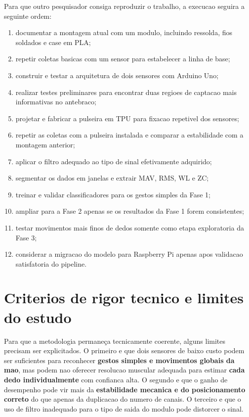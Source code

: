 \documentclass[12pt,oneside,a4paper,brazilian]{abntex2}
\begin{document}
Para que outro pesquisador consiga reproduzir o trabalho, a execucao seguira a seguinte ordem:

\begin{enumerate}
  \item documentar a montagem atual com um modulo, incluindo ressolda, fios soldados e case em PLA;
  \item repetir coletas basicas com um sensor para estabelecer a linha de base;
  \item construir e testar a arquitetura de dois sensores com Arduino Uno;
  \item realizar testes preliminares para encontrar duas regioes de captacao mais informativas no antebraco;
  \item projetar e fabricar a pulseira em TPU para fixacao repetivel dos sensores;
  \item repetir as coletas com a pulseira instalada e comparar a estabilidade com a montagem anterior;
  \item aplicar o filtro adequado ao tipo de sinal efetivamente adquirido;
  \item segmentar os dados em janelas e extrair MAV, RMS, WL e ZC;
  \item treinar e validar classificadores para os gestos simples da Fase 1;
  \item ampliar para a Fase 2 apenas se os resultados da Fase 1 forem consistentes;
  \item testar movimentos mais finos de dedos somente como etapa exploratoria da Fase 3;
  \item considerar a migracao do modelo para Raspberry Pi apenas apos validacao satisfatoria do pipeline.
\end{enumerate}

\section{Criterios de rigor tecnico e limites do estudo}

Para que a metodologia permaneça tecnicamente coerente, alguns limites precisam ser explicitados. O primeiro e que dois sensores de baixo custo podem ser suficientes para reconhecer \textbf{gestos simples e movimentos globais da mao}, mas podem nao oferecer resolucao muscular adequada para estimar \textbf{cada dedo individualmente} com confianca alta. O segundo e que o ganho de desempenho pode vir mais da \textbf{estabilidade mecanica e do posicionamento correto} do que apenas da duplicacao do numero de canais. O terceiro e que o uso de filtro inadequado para o tipo de saida do modulo pode distorcer o sinal.
\end{document}
